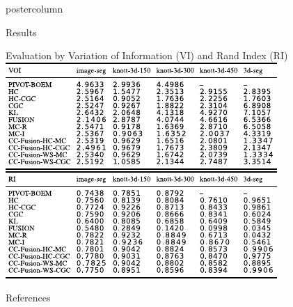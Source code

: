 \documentclass[final,hyperref={pdfpagelabels=false}]{beamer}
\begin{document}
\begin{frame}
\begin{columns}
\begin{column}{.49\textwidth}
\begin{beamercolorbox}[center,wd=\textwidth]{postercolumn}
\begin{minipage}[T]{.95\textwidth}
{\begin{block}{Results}
            \end{block}
            \vfill
            \begin{block}{Evaluation by Variation of Information (VI) and Rand Index (RI)}
              \centering
              \includegraphics[width=0.7\linewidth]{virib.pdf}            
            \end{block}
            \vfill
            \vfill
            \begin{block}{References}
                \footnotesize
                
                
            \end{block}
            \vfill
          }
        \end{minipage}

\end{beamercolorbox}
\end{column}
\end{columns}
\end{frame}
\end{document}
